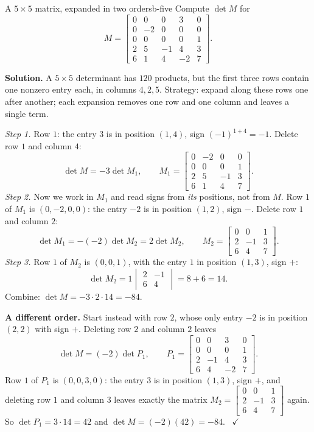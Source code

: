 \documentclass[11pt]{article}
\begin{document}
\begin{exmp}{A $5\times5$ matrix, expanded in two orders}{b-five}
Compute $\det M$ for
\[
M=\begin{bmatrix}0&0&0&3&0\\0&-2&0&0&0\\0&0&0&0&1\\2&5&-1&4&3\\6&1&4&-2&7\end{bmatrix}.
\]

\textbf{Solution.} A $5\times5$ determinant has $120$ products, but the first three rows contain one nonzero entry each, in columns $4,2,5$. Strategy: expand along these rows one after another; each expansion removes one row and one column and leaves a single term.

\emph{Step 1.} Row $1$: the entry $3$ is in position $(1,4)$, sign $(-1)^{1+4}=-1$. Delete row $1$ and column $4$:
\[
\det M=-3\det M_1,\qquad M_1=\begin{bmatrix}0&-2&0&0\\0&0&0&1\\2&5&-1&3\\6&1&4&7\end{bmatrix}.
\]
\emph{Step 2.} Now we work in $M_1$ and read signs from \emph{its} positions, not from $M$. Row $1$ of $M_1$ is $(0,-2,0,0)$: the entry $-2$ is in position $(1,2)$, sign $-$. Delete row $1$ and column $2$:
\[
\det M_1=-(-2)\det M_2=2\det M_2,\qquad M_2=\begin{bmatrix}0&0&1\\2&-1&3\\6&4&7\end{bmatrix}.
\]
\emph{Step 3.} Row $1$ of $M_2$ is $(0,0,1)$, with the entry $1$ in position $(1,3)$, sign $+$:
\[
\det M_2=1\begin{vmatrix}2&-1\\6&4\end{vmatrix}=8+6=14.
\]
Combine: $\det M=-3\cdot2\cdot14=-84$.

\textbf{A different order.} Start instead with row $2$, whose only entry $-2$ is in position $(2,2)$ with sign $+$. Deleting row $2$ and column $2$ leaves
\[
\det M=(-2)\det P_1,\qquad P_1=\begin{bmatrix}0&0&3&0\\0&0&0&1\\2&-1&4&3\\6&4&-2&7\end{bmatrix}.
\]
Row $1$ of $P_1$ is $(0,0,3,0)$: the entry $3$ is in position $(1,3)$, sign $+$, and deleting row $1$ and column $3$ leaves exactly the matrix $M_2=\begin{bmatrix}0&0&1\\2&-1&3\\6&4&7\end{bmatrix}$ again. So $\det P_1=3\cdot14=42$ and $\det M=(-2)(42)=-84$. \ $\checkmark$


\end{exmp}
\end{document}
